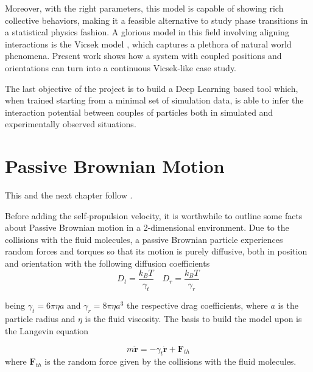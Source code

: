 \documentclass[../master_thesis_np.tex]{subfiles}
\begin{document}
	Moreover, with the right parameters, this model is capable of showing rich collective behaviors, making it a feasible alternative to study phase transitions in a statistical physics fashion. A glorious model in this field involving aligning interactions is the Vicsek model \parencite{vicsek_novel_1995}, which captures a plethora of natural world phenomena. Present work shows how a system with coupled positions and orientations can turn into a continuous Vicsek-like case study.
	
	The last objective of the project is to build a Deep Learning based tool which, when trained starting from a minimal set of simulation data, is able to infer the interaction potential between couples of particles both in simulated and experimentally observed situations.


	\section{Passive Brownian Motion}
	{\color{red} This and the next chapter follow \parencite{callegari_numerical_2019}.}

	Before adding the self-propulsion velocity, it is worthwhile to outline some facts about Passive Brownian motion in a 2-dimensional environment.
	Due to the collisions with the fluid molecules, a passive Brownian particle experiences random forces and torques so that its motion is purely diffusive, both in position and orientation with the following diffusion coefficients
	\begin{equation}
		D_t = \frac{k_B T}{\gamma_t} \quad D_r = \frac{k_B T}{\gamma_r} 
	\end{equation}
	
	being $\gamma_t = 6 \pi \eta a$ and $\gamma_r = 8 \pi \eta a^3$  the respective drag coefficients, where $a$ is the particle radius and $\eta$ is the fluid viscosity. The basis to build the model upon is the Langevin equation
	
	\begin{equation} \label{eq:lang1}
		m \mathbf{\ddot{r}} = -\gamma_t \mathbf{\dot{r}} + \mathbf{F}_{th}
	\end{equation} 
	where $\mathbf{F}_{th}$ is the random force given by the collisions with the fluid molecules.
	
\end{document}

